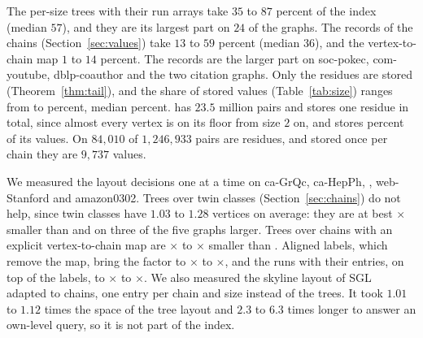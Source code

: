 The per-size trees with their run arrays take $35$ to $87$ percent of the index (median $57$), and they are its largest part on $24$ of the \numgraphs{} graphs.
%
The records of the chains (Section~\ref{sec:values}) take $13$ to $59$ percent (median $36$), and the vertex-to-chain map $1$ to $14$ percent.
%
The records are the larger part on \textsf{soc-pokec}, \textsf{com-youtube}, \textsf{dblp-coauthor} and the two citation graphs.
%
Only the residues are stored (Theorem~\ref{thm:tail}), and the share of stored values (Table~\ref{tab:size}) ranges from \storedmin{} to \storedmax{} percent, median \storedmedian{} percent.
%
\webuk has $23.5$ million pairs and stores one residue in total, since almost every vertex is on its floor from size $2$ on, and \emailcore stores \storedmax{} percent of its values.
%
On \dblp $84{,}010$ of $1{,}246{,}933$ pairs are residues, and stored once per chain they are $9{,}737$ values.
%

We measured the layout decisions one at a time on \textsf{ca-GrQc}, \textsf{ca-HepPh}, \dblp, \textsf{web-Stanford} and \textsf{amazon0302}.
%
Trees over twin classes (Section~\ref{sec:chains}) do not help, since twin classes have $1.03$ to $1.28$ vertices on average: they are at best \laytwinmax$\times$ smaller than \strees and on three of the five graphs larger.
%
Trees over chains with an explicit vertex-to-chain map are \laychainmin$\times$ to \laychainmax$\times$ smaller than \strees.
%
Aligned labels, which remove the map, bring the factor to \layalignmin$\times$ to \layalignmax$\times$, and the runs with their entries, on top of the labels, to \layfinalmin$\times$ to \layfinalmax$\times$.
%
We also measured the skyline layout of SGL~\cite{SGL} adapted to chains, one entry per chain and size instead of the trees.
%
It took $1.01$ to $1.12$ times the space of the tree layout and $2.3$ to $6.3$ times longer to answer an own-level query, so it is not part of the index.

